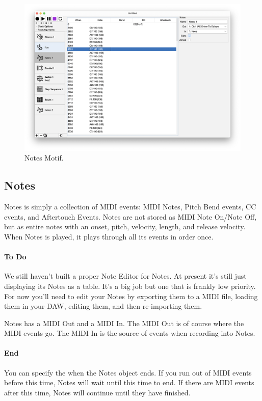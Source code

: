 \documentclass[twoside,10pt]{article}
\begin{document}
\clearpage

\begin{figure}[t]
\centering
\includegraphics[width=6.5in]{Notes}
\vspace{-2em}
\caption{Notes Motif.}
\label{notes}
\end{figure}

\subsection{Notes}
 
Notes is simply a collection of MIDI events: MIDI Notes, Pitch Bend events, CC events, and Aftertouch Events.  Notes are not stored as MIDI Note On/Note Off, but as entire notes with an onset, pitch, velocity, length, and release velocity.   When Notes is played, it plays through all its events in order once.

\paragraph{\color{red} To Do} We still haven't built a proper Note Editor for Notes.  At present it's still just displaying its Notes as a table.  It's a big job but one that is frankly low priority.  For now you'll need to edit your Notes by exporting them to a MIDI file, loading them in your DAW, editing them, and then re-importing them.

Notes has a MIDI Out and a MIDI In.  The MIDI Out is of course where the MIDI events go.  The MIDI In is the source of events when recording into Notes.

\paragraph{End} You can specify the when the Notes object ends.   If you run out of MIDI events before this time, Notes will wait until this time to end.  If there are MIDI events after this time, Notes will continue until they have finished.
\end{document}
